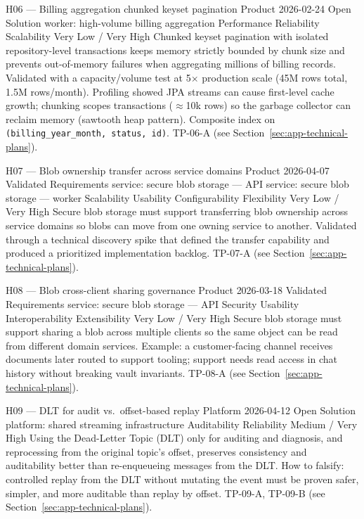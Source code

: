 \hypoboxnine%
  {H06 --- Billing aggregation chunked keyset pagination}%
  {Product}%
  {2026-02-24}%
  {Open}%
  {Solution}%
  {worker: high-volume billing aggregation}%
  {Performance \textbar{} Reliability \textbar{} Scalability}%
  {Very Low / Very High}%
  {Chunked keyset pagination with isolated repository-level transactions keeps
   memory strictly bounded by chunk size and prevents out-of-memory failures when
   aggregating millions of billing records.}%
\hypoboxtail%
  {Validated with a capacity/volume test at 5$\times$ production scale (45M rows
   total, 1.5M rows/month). Profiling showed JPA streams can cause first-level
   cache growth; chunking scopes transactions ($\approx$10k rows) so the garbage
   collector can reclaim memory (sawtooth heap pattern). Composite index on
   \texttt{(billing\_year\_month, status, id)}.}%
  {TP-06-A (see Section~\ref{sec:app-technical-plans}).}

\hypoboxnine%
  {H07 --- Blob ownership transfer across service domains}%
  {Product}%
  {2026-04-07}%
  {Validated}%
  {Requirements}%
  {service: secure blob storage — API \textbar{} service: secure blob storage — worker}%
  {Scalability \textbar{} Usability \textbar{} Configurability \textbar{} Flexibility}%
  {Very Low / Very High}%
  {Secure blob storage must support transferring blob ownership across service
   domains so blobs can move from one owning service to another.}%
\hypoboxtail%
  {Validated through a technical discovery spike that defined the transfer
   capability and produced a prioritized implementation backlog.}%
  {TP-07-A (see Section~\ref{sec:app-technical-plans}).}

\hypoboxnine%
  {H08 --- Blob cross-client sharing governance}%
  {Product}%
  {2026-03-18}%
  {Validated}%
  {Requirements}%
  {service: secure blob storage — API}%
  {Security \textbar{} Usability \textbar{} Interoperability \textbar{} Extensibility}%
  {Very Low / Very High}%
  {Secure blob storage must support sharing a blob across multiple clients so the
   same object can be read from different domain services.}%
\hypoboxtail%
  {Example: a customer-facing channel receives documents later routed to support
   tooling; support needs read access in chat history without breaking vault
   invariants.}%
  {TP-08-A (see Section~\ref{sec:app-technical-plans}).}

\hypoboxnine%
  {H09 --- DLT for audit vs.\ offset-based replay}%
  {Platform}%
  {2026-04-12}%
  {Open}%
  {Solution}%
  {platform: shared streaming infrastructure}%
  {Auditability \textbar{} Reliability}%
  {Medium / Very High}%
  {Using the Dead-Letter Topic (DLT) only for auditing and diagnosis, and
   reprocessing from the original topic's offset, preserves consistency and
   auditability better than re-enqueueing messages from the DLT.}%
\hypoboxtail%
  {How to falsify: controlled replay from the DLT without mutating the event must
   be proven safer, simpler, and more auditable than replay by offset.}%
  {TP-09-A, TP-09-B (see Section~\ref{sec:app-technical-plans}).}

